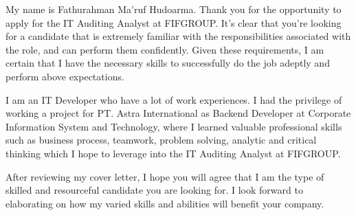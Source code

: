 \begin{cvletter}

My name is Fathurahman Ma'ruf Hudoarma. Thank you for the opportunity to apply for the IT Auditing Analyst at FIFGROUP. It’s clear that you’re looking for a candidate that is extremely familiar with the responsibilities associated with the role, and can perform them confidently. Given these requirements, I am certain that I have the necessary skills to successfully do the job adeptly and perform above expectations.

I am an IT Developer who have a lot of work experiences. I had the privilege of working a project for PT. Astra International as Backend Developer at Corporate Information System and Technology, where I learned valuable professional skills such as business process, teamwork, problem solving, analytic and critical thinking which I hope to leverage into the IT Auditing Analyst at FIFGROUP.

After reviewing my cover letter, I hope you will agree that I am the type of skilled and resourceful candidate you are looking for. I look forward to elaborating on how my varied skills and abilities will benefit your company.

\end{cvletter}